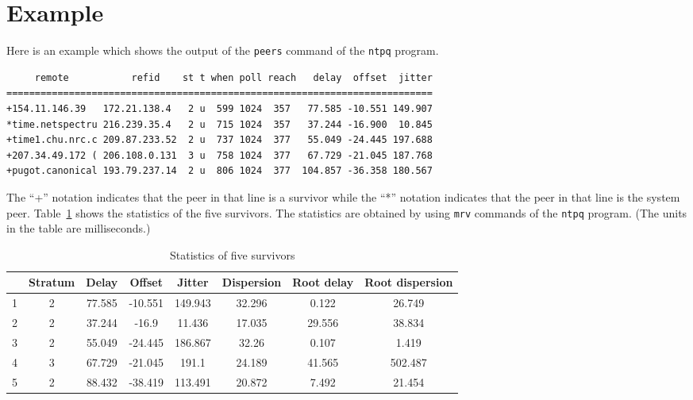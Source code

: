 \section{Example}%
\label{sec:example}
Here is an example which shows the output of the \verb|peers| command of the
\verb|ntpq| program.
\begin{small}
\begin{verbatim}
     remote           refid    st t when poll reach   delay  offset  jitter
===========================================================================
+154.11.146.39   172.21.138.4   2 u  599 1024  357   77.585 -10.551 149.907
*time.netspectru 216.239.35.4   2 u  715 1024  357   37.244 -16.900  10.845
+time1.chu.nrc.c 209.87.233.52  2 u  737 1024  377   55.049 -24.445 197.688
+207.34.49.172 ( 206.108.0.131  3 u  758 1024  377   67.729 -21.045 187.768
+pugot.canonical 193.79.237.14  2 u  806 1024  377  104.857 -36.358 180.567
\end{verbatim}
\end{small}

The ``+'' notation indicates that the peer in that line is a survivor while the
``*'' notation indicates that the peer in that line is the system peer.
Table~\ref{tab:sur} shows the statistics of the five survivors.
The statistics are obtained by using \verb|mrv| commands of the \verb|ntpq|
program. (The units in the table are milliseconds.)

\begin{table}[htpb]
    \centering
    \caption{Statistics of five survivors}
    \label{tab:sur}
    \begin{tabular}{|c|c|c|c|c|c|c|c|}
        \hline
         & Stratum & Delay & Offset & Jitter & Dispersion & Root delay & Root
        dispersion \\
        \hline
        1 & 2 & 77.585 & -10.551 & 149.943 & 32.296 & 0.122  & 26.749  \\
        2 & 2 & 37.244 & -16.9   & 11.436  & 17.035 & 29.556 & 38.834  \\
        3 & 2 & 55.049 & -24.445 & 186.867 & 32.26  & 0.107  & 1.419   \\
        4 & 3 & 67.729 & -21.045 & 191.1   & 24.189 & 41.565 & 502.487 \\
        5 & 2 & 88.432 & -38.419 & 113.491 & 20.872 & 7.492  & 21.454  \\
        \hline
    \end{tabular}
\end{table}


